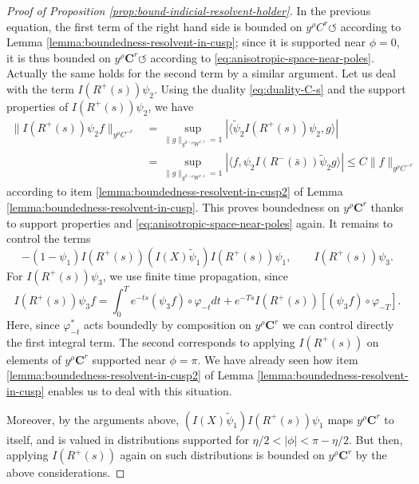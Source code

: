 \documentclass[JEP,XML,SOM,Unicode,NoFloatCountersInSection]{cedram}
\newcommand{\bC}{\boldsymbol{C}}
\theoremstyle{plain}
\theoremstyle{definition}
\begin{document}
\begin{proof}[Proof of Proposition \ref{prop:bound-indicial-resolvent-holder}]
In the previous equation, the first term of the right hand side is bounded on $y^\rho C^r \circlearrowleft$ according to Lemma \ref{lemma:boundedness-resolvent-in-cusp}; since it is supported near $\phi=0$, it is thus bounded on $y^\rho \bC^r \circlearrowleft$ according to \eqref{eq:anisotropic-space-near-poles}. Actually the same holds for the second term by a similar argument. Let us deal with the term $I(R^+(s)) \psi_2$. Using the duality \eqref{eq:duality-C-s} and the support properties of $I(R^+(s)) \psi_2$, we have\vspace*{-3pt}
\[
\begin{split}
\| I(R^+(s)) \psi_2 f \|_{y^{\rho}C^{-r}} & = \sup_{\|g\|_{y^{d-\rho}W^{r,1}}=1} |\langle \tilde{\psi}_2 I(R^+(s)) \psi_2, g \rangle| \\[-3pt]
& = \sup_{\|g\|_{y^{d-\rho}W^{r,1}}=1} |\langle f, \psi_2 I(R^-(\bar{s})) \tilde{\psi}_2 g \rangle| \leq C \|f\|_{y^{\rho}C^{-r}}
\end{split}
\]
according to item \eqref{lemma:boundedness-resolvent-in-cusp2} of Lemma \ref{lemma:boundedness-resolvent-in-cusp}. This proves boundedness on $y^\rho \bC^r$ thanks to support properties and \eqref{eq:anisotropic-space-near-poles} again. It remains to control the terms\vspace*{-3pt}
\[
-(1-\psi_1) I(R^+(s)) (I(X) \widetilde{\psi}_1) I(R^+(s))\psi_1, \qquad I(R^+(s))\psi_3.
\]
For $I(R^+(s))\psi_3$, we use finite time propagation, since\vspace*{-3pt}\enlargethispage{\baselineskip}
\[
I(R^+(s))\psi_3 f = \int_0^T e^{-t s} (\psi_3 f)\circ\varphi_{-t} dt + e^{-Ts}I(R^+(s))[(\psi_3 f) \circ \varphi_{-T}].
\]
Here, since $\varphi_{-t}^*$ acts boundedly by composition on $y^\rho \bC^r$ we can control directly the first integral term. The second corresponds to applying $I(R^+(s))$ on elements of $y^\rho\bC^r$ supported near $\phi =\pi$. We have already seen how item \eqref{lemma:boundedness-resolvent-in-cusp2} of Lemma \ref{lemma:boundedness-resolvent-in-cusp} enables us to deal with this situation.

Moreover, by the arguments above, $(I(X)\tilde{\psi}_1) I(R^+(s))\psi_1$ maps $y^\rho \bC^r$ to itself, and is valued in distributions supported for $\eta/2 <|\phi|< \pi - \eta/2$. But then, applying $I(R^+(s))$ again on such distributions is bounded on $y^\rho \bC^r$ by the above considerations.
\end{proof}

\backmatter


\end{document}
